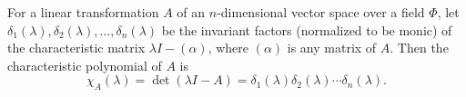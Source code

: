 For a linear transformation $A$ of an $n$-dimensional vector space over a field $\Phi$, let $\delta_1(\lambda), \delta_2(\lambda), \ldots, \delta_n(\lambda)$ be the invariant factors (normalized to be monic) of the characteristic matrix $\lambda I - (\alpha)$, where $(\alpha)$ is any matrix of $A$. Then the characteristic polynomial of $A$ is
$$\chi_A(\lambda) = \det(\lambda I - A) = \delta_1(\lambda) \delta_2(\lambda) \cdots \delta_n(\lambda).$$
